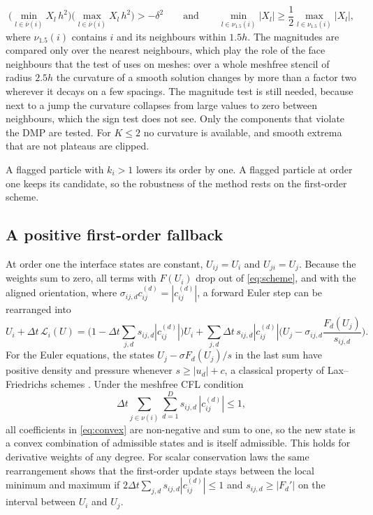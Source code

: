 \documentclass[11pt,a4paper]{article}
\numberwithin{equation}{section}
\newcommand{\nb}{\nu}
\newcommand{\cnb}{\bar\nu}
\newcommand{\Lop}{\mathcal{L}}
\begin{document}
\begin{itemize}
\begin{equation}\label{eq:u2}
\big(\min_{l\in\cnb(i)}X_l\,h^2\big)\big(\max_{l\in\cnb(i)}X_l\,h^2\big)>-\delta^2\qquad\text{and}\qquad\min_{l\in\nb_{1.5}(i)}|X_l|\ge\frac12\max_{l\in\nb_{1.5}(i)}|X_l|,
\end{equation}
where $\nb_{1.5}(i)$ contains $i$ and its neighbours within $1.5h$. The magnitudes are compared only over the nearest neighbours, which play the role of the face neighbours that the test of \cite{Diot2012} uses on meshes: over a whole meshfree stencil of radius $2.5h$ the curvature of a smooth solution changes by more than a factor two wherever it decays on a few spacings. The magnitude test is still needed, because next to a jump the curvature collapses from large values to zero between neighbours, which the sign test does not see. Only the components that violate the DMP are tested. For $K\le2$ no curvature is available, and smooth extrema that are not plateaus are clipped.
\end{itemize}
A flagged particle with $k_i>1$ lowers its order by one. A flagged particle at order one keeps its candidate, so the robustness of the method rests on the first-order scheme.

\subsection{A positive first-order fallback}\label{sec:positivity}

At order one the interface states are constant, $U_{ij}=U_i$ and $U_{ji}=U_j$. Because the weights sum to zero, all terms with $F(U_i)$ drop out of \eqref{eq:scheme}, and with the aligned orientation, where $\sigma_{ij,d}c^{(d)}_{ij}=|c^{(d)}_{ij}|$, a forward Euler step can be rearranged into
\begin{equation}\label{eq:convex}
U_i+\Delta t\,\Lop_i(U)=\Big(1-\Delta t\sum_{j,d}s_{ij,d}|c^{(d)}_{ij}|\Big)U_i+\sum_{j,d}\Delta t\,s_{ij,d}|c^{(d)}_{ij}|\Big(U_j-\sigma_{ij,d}\frac{F_d(U_j)}{s_{ij,d}}\Big).
\end{equation}
For the Euler equations, the states $U_j-\sigma F_d(U_j)/s$ in the last sum have positive density and pressure whenever $s\ge|u_d|+c$, a classical property of Lax--Friedrichs schemes \cite{PerthameShu1996,ZhangShu2010}. Under the meshfree CFL condition
\begin{equation}\label{eq:cflpos}
\Delta t\sum_{j\in\nb(i)}\sum_{d=1}^Ds_{ij,d}\,|c^{(d)}_{ij}|\le1,
\end{equation}
all coefficients in \eqref{eq:convex} are non-negative and sum to one, so the new state is a convex combination of admissible states and is itself admissible. This holds for derivative weights of any degree. For scalar conservation laws the same rearrangement shows that the first-order update stays between the local minimum and maximum if $2\Delta t\sum_{j,d}s_{ij,d}|c^{(d)}_{ij}|\le1$ and $s_{ij,d}\ge|F_d'|$ on the interval between $U_i$ and $U_j$.
\end{document}
